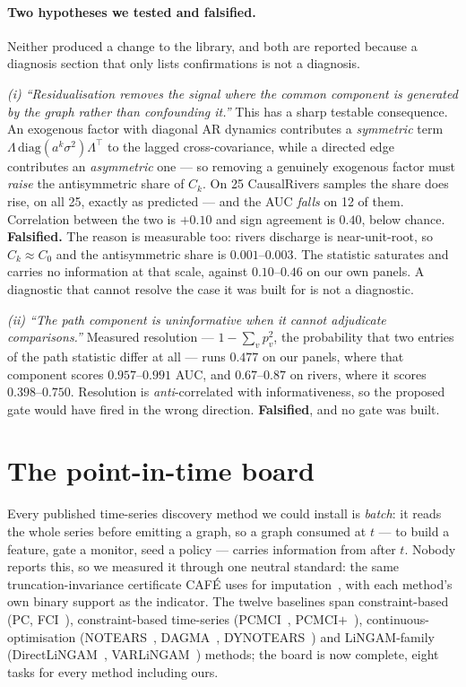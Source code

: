 \documentclass[10pt,twocolumn]{article}
\newcommand{\cafe}{CAF\'E}
\begin{document}
\paragraph{Two hypotheses we tested and falsified.} Neither produced a change to the
library, and both are reported because a diagnosis section that only lists confirmations
is not a diagnosis.

\emph{(i) ``Residualisation removes the signal where the common component is generated
by the graph rather than confounding it.''} This has a sharp testable consequence. An
exogenous factor with diagonal AR dynamics contributes a \emph{symmetric} term
$\Lambda\,\mathrm{diag}(a^k\sigma^2)\Lambda^\top$ to the lagged cross-covariance, while
a directed edge contributes an \emph{asymmetric} one --- so removing a genuinely
exogenous factor must \emph{raise} the antisymmetric share of $C_k$. On 25 CausalRivers
samples the share does rise, on all 25, exactly as predicted --- and the AUC
\emph{falls} on 12 of them. Correlation between the two is $+0.10$ and sign agreement is
$0.40$, below chance. \textbf{Falsified.} The reason is measurable too: rivers discharge
is near-unit-root, so $C_k \approx C_0$ and the antisymmetric share is $0.001$--$0.003$.
The statistic saturates and carries no information at that scale, against $0.10$--$0.46$
on our own panels. A diagnostic that cannot resolve the case it was built for is not a
diagnostic.

\emph{(ii) ``The path component is uninformative when it cannot adjudicate
comparisons.''} Measured resolution --- $1 - \sum_v p_v^2$, the probability that two
entries of the path statistic differ at all --- runs $0.477$ on our panels, where that
component scores $0.957$--$0.991$ AUC, and $0.67$--$0.87$ on rivers, where it scores
$0.398$--$0.750$. Resolution is \emph{anti}-correlated with informativeness, so the
proposed gate would have fired in the wrong direction. \textbf{Falsified}, and no gate
was built.

\section{The point-in-time board}\label{sec:pit}
Every published time-series discovery method we could install is \emph{batch}: it reads
the whole series before emitting a graph, so a graph consumed at $t$ --- to build a
feature, gate a monitor, seed a policy --- carries information from after $t$. Nobody
reports this, so we measured it through one neutral standard: the same
truncation-invariance certificate \cafe{} uses for imputation~\cite{position}, with each
method's own binary support as the indicator. The twelve baselines span constraint-based (PC, FCI~\cite{spirtes2000}),
constraint-based time-series (PCMCI~\cite{runge2019}, PCMCI$+$~\cite{runge2020}),
continuous-optimisation (NOTEARS~\cite{notears}, DAGMA~\cite{dagma},
DYNOTEARS~\cite{dynotears}) and LiNGAM-family
(DirectLiNGAM~\cite{shimizu2006}, VARLiNGAM~\cite{hyvarinen2010}) methods; the board is
now complete, eight tasks for every method including ours.
\end{document}
